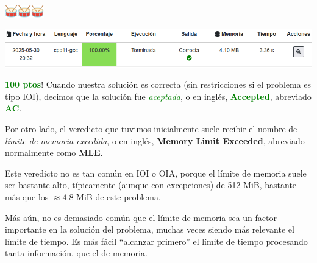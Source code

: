 \documentclass{beamer}
\begin{document}
    \begin{frame}[noframenumbering]
        \begin{center}
            \includegraphics[width=16pt]{./res/drumroll.png}\includegraphics[width=16pt]{./res/drumroll.png}\includegraphics[width=16pt]{./res/drumroll.png}
        \end{center} \pause

        \begin{center}
            \includegraphics[width=.9\linewidth]{./res/ou_problem_ac_char.png}
        \end{center} \pause

        \textbf{\textcolor{green}{100 ptos}}! \pause Cuando nuestra solución es correcta (sin restricciones si el problema es tipo IOI), decimos que la solución fue \textit{\textcolor{green}{aceptada}}, o en inglés, \textbf{\textcolor{green}{Accepted}}, abreviado \textbf{\textcolor{green}{AC}}. \pause \vspace{4pt}

        Por otro lado, el veredicto que tuvimos inicialmente suele recibir el nombre de \textit{límite de memoria excedida}, o en inglés, \textbf{Memory Limit Exceeded}, abreviado normalmente como \textbf{MLE}. \pause

        Este veredicto no es tan común en IOI o OIA, porque el límite de memoria suele ser bastante alto, típicamente (aunque con excepciones) de 512 MiB, bastante más que los $\approx 4.8$ MiB de este problema. \pause 

        Más aún, no es demasiado común que el límite de memoria sea un factor importante en la solución del problema, muchas veces siendo más relevante el límite de tiempo. \pause Es más fácil ``alcanzar primero'' el límite de tiempo procesando tanta información, que el de memoria.
    \end{frame}
\end{document}
